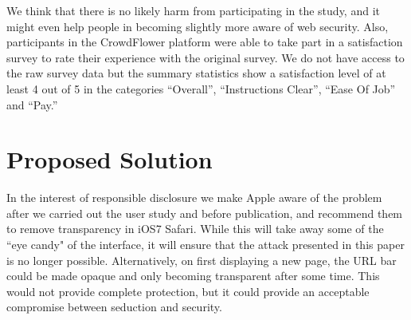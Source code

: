 \documentclass[twoside,letterpaper]{soups}
\begin{document}
We think that there is no likely harm from participating in the study, and it might even help people in becoming slightly more aware of web security. Also, participants in the CrowdFlower platform were able to take part in a satisfaction survey to rate their experience with the original survey. We do not have access to the raw survey data but the summary statistics show a satisfaction level of at least 4 out of 5 in the categories ``Overall'', ``Instructions Clear'', ``Ease Of Job'' and ``Pay.''






\section{Proposed Solution}\label{chap:solution}


In the interest of responsible disclosure we make Apple aware of the problem after we carried out the user study and before publication, and recommend them to remove transparency in iOS7 Safari. While this will take away some of the ``eye candy" of the interface, it will ensure that the attack presented in this paper is no longer possible. Alternatively, on first displaying a new page, the URL bar could be made opaque and only becoming transparent after some time. This would not provide complete protection, but it could provide an acceptable compromise between seduction and security.
\end{document}
